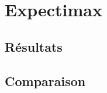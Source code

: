 \documentclass{article}
\begin{document}


\section{Expectimax}
\subsection{Résultats}
\subsection{Comparaison}
\end{document}
